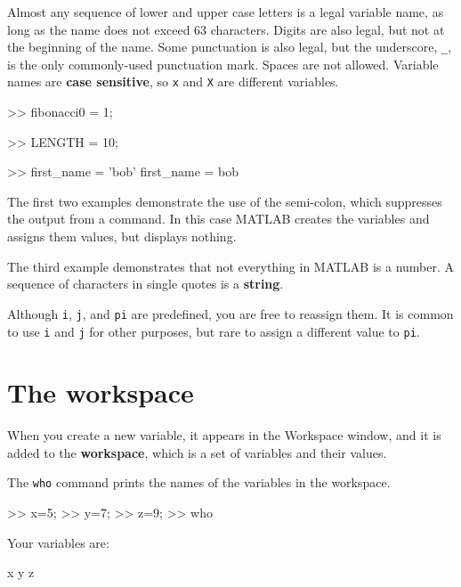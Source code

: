 \documentclass[
]{book}
\numberwithin{Answer}{chapter}
\numberwithin{Exercise}{chapter}
\begin{document}
Almost any sequence of lower and upper case letters is a legal
variable name, as long as the name does not exceed 63 characters.  
Digits are also legal, but not at the beginning of the name.
Some punctuation is also legal, but the underscore,
\verb"_", is the only commonly-used punctuation mark.  
Spaces are not allowed.  Variable names are
{\bf case sensitive}, so {\tt x} and {\tt X} are different variables.

\begin{code}
>> fibonacci0 = 1;

>> LENGTH = 10;

>> first_name = 'bob'
first_name = bob
\end{code}

The first two examples demonstrate the use of the semi-colon, which
suppresses the output from a command.  In this case MATLAB creates the
variables and assigns them values, but displays nothing.


The third example demonstrates that not everything
in MATLAB is a number.
A sequence of characters in single quotes is
a {\bf string}.


Although {\tt i}, {\tt j}, and {\tt pi} are predefined, you are free
to reassign them.  It is common to use {\tt i} and {\tt j} for other
purposes, but rare to assign a different value to
{\tt pi}.



\section{The workspace}

When you create a new variable, it appears in the {\sf Workspace} window, and it is added to the {\bf workspace}, which is a
set of variables and their values.


The {\tt who} command prints the
names of the variables in the workspace.


\begin{code}
>> x=5;
>> y=7;
>> z=9;
>> who

Your variables are:

x  y  z
\end{code}
\end{document}
